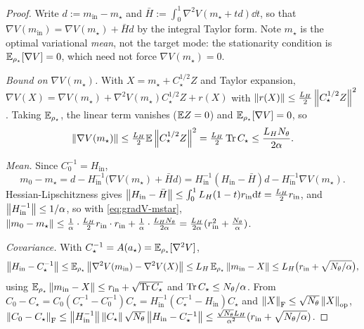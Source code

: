 \begin{proof}
Write $d:=m_{\mathrm{in}}-m_\star$ and $\bar H:=\int_0^1\nabla^2V(m_\star+td)\dd t$, so that
$\nabla V(m_{\mathrm{in}})=\nabla V(m_\star)+\bar H d$ by the integral Taylor form. Note $m_\star$ is the
optimal variational \emph{mean}, not the target mode: the stationarity condition is
$\mathbb{E}_{\rho_\star}[\nabla V]=0$, which need not force $\nabla V(m_\star)=0$.

\emph{Bound on $\nabla V(m_\star)$.} With $X=m_\star+C_\star^{1/2}Z$ and Taylor expansion,
$\nabla V(X)=\nabla V(m_\star)+\nabla^2V(m_\star)C_\star^{1/2}Z+r(X)$ with $\left\lVert r(X)\right\rVert\leq\tfrac{L_H}2\left\lVert C_\star^{1/2}Z\right\rVert^2$.
Taking $\mathbb{E}_{\rho_\star}$, the linear term vanishes ($\mathbb{E} Z=0$) and $\mathbb{E}_{\rho_\star}[\nabla V]=0$, so
\begin{equation}
\label{eq:gradV-mstar}
    \left\lVert \nabla V(m_\star)\right\rVert\leq\tfrac{L_H}2\mathbb{E}\left\lVert C_\star^{1/2}Z\right\rVert^2=\tfrac{L_H}2\operatorname{Tr} C_\star\leq\frac{L_H N_\theta}{2\alpha}.
\end{equation}

\emph{Mean.} Since $C_0^{-1}=H_{\mathrm{in}}$,
\[
    m_0-m_\star=d-H_{\mathrm{in}}^{-1}\bigl(\nabla V(m_\star)+\bar H d\bigr)
    =H_{\mathrm{in}}^{-1}(H_{\mathrm{in}}-\bar H)d-H_{\mathrm{in}}^{-1}\nabla V(m_\star).
\]
Hessian-Lipschitzness gives $\left\lVert H_{\mathrm{in}}-\bar H\right\rVert\leq\int_0^1L_H(1-t)r_{\mathrm{in}}\mathrm{d} t=\tfrac{L_H}2r_{\mathrm{in}}$,
and $\left\lVert H_{\mathrm{in}}^{-1}\right\rVert\leq1/\alpha$, so with \eqref{eq:gradV-mstar},
$\left\lVert m_0-m_\star\right\rVert\leq\tfrac1\alpha\cdot\tfrac{L_H}2r_{\mathrm{in}}\cdot r_{\mathrm{in}}+\tfrac1\alpha\cdot\tfrac{L_H N_\theta}{2\alpha}=\tfrac{L_H}{2\alpha}(r_{\mathrm{in}}^2+\tfrac{N_\theta}\alpha)$.

\emph{Covariance.} With $C_\star^{-1}=A(a_\star)=\mathbb{E}_{\rho_\star}[\nabla^2V]$,
\[
    \left\lVert H_{\mathrm{in}}-C_\star^{-1}\right\rVert\leq\mathbb{E}_{\rho_\star}\left\lVert \nabla^2V(m_{\mathrm{in}})-\nabla^2V(X)\right\rVert
    \leq L_H\,\mathbb{E}_{\rho_\star}\left\lVert m_{\mathrm{in}}-X\right\rVert\leq L_H\bigl(r_{\mathrm{in}}+\sqrt{N_\theta/\alpha}\bigr),
\]
using $\mathbb{E}_{\rho_\star}\left\lVert m_{\mathrm{in}}-X\right\rVert\leq r_{\mathrm{in}}+\sqrt{\operatorname{Tr} C_\star}$ and
$\operatorname{Tr} C_\star\leq N_\theta/\alpha$. From $C_0-C_\star=C_0(C_\star^{-1}-C_0^{-1})C_\star=H_{\mathrm{in}}^{-1}(C_\star^{-1}-H_{\mathrm{in}})C_\star$
and $\left\lVert X\right\rVert_{\mathrm{F}}\leq\sqrt{N_\theta}\left\lVert X\right\rVert_{\mathrm{op}}$,
$\left\lVert C_0-C_\star\right\rVert_{\mathrm{F}}\leq\left\lVert H_{\mathrm{in}}^{-1}\right\rVert\left\lVert C_\star\right\rVert\sqrt{N_\theta}\left\lVert H_{\mathrm{in}}-C_\star^{-1}\right\rVert\leq\tfrac{\sqrt{N_\theta}L_H}{\alpha^2}(r_{\mathrm{in}}+\sqrt{N_\theta/\alpha})$.


\end{proof}
